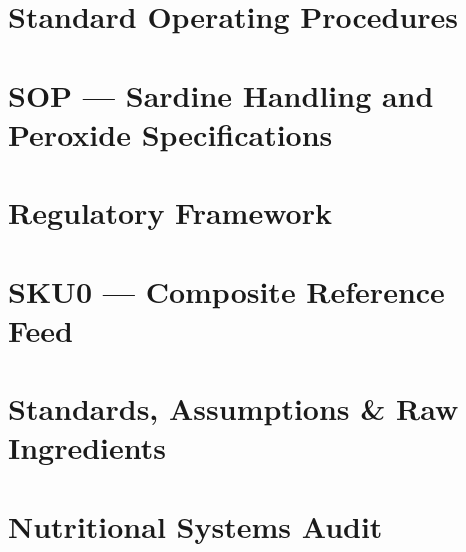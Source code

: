 \documentclass[11pt,oneside]{book}
\begin{document}
\chapter{Standard Operating Procedures}










\chapter{SOP --- Sardine Handling and Peroxide Specifications}


\chapter{Regulatory Framework}

\chapter{SKU0 --- Composite Reference Feed}



\appendix
\growlrrappendixformat
\chapter{Standards, Assumptions \& Raw Ingredients}






\chapter{Nutritional Systems Audit}













\end{document}
